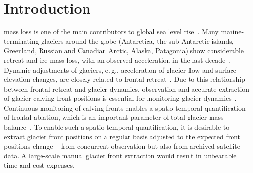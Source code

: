 \documentclass[lettersize,journal,siunitx]{IEEEtran}
\newcommand{\eg}{e.\,g.,\xspace}
\begin{document}
\section{Introduction}
 mass loss is one of the main contributors to global sea level rise~\cite{frederikse2020causes}. Many marine-terminating glaciers around the globe (Antarctica, the sub-Antarctic islands, Greenland, Russian and Canadian Arctic, Alaska, Patagonia) show considerable retreat and ice mass loss, with an observed acceleration in the last decade~\cite{vaughan2014observations,imbie2018mass,hugonnet2021accelerated}.
 Dynamic adjustments of glaciers, \eg acceleration of glacier flow and surface elevation changes, are closely related to frontal retreat~\cite{frank2022geometric}. Due to this relationship between frontal retreat and glacier dynamics, observation and accurate extraction of glacier calving front positions is essential for monitoring glacier dynamics~\cite{davari2020glacier}. Continuous monitoring of calving fronts enables a spatio-temporal quantification of frontal ablation, which is an important parameter of total glacier mass balance~\cite{liu2021automated}. To enable such a spatio-temporal quantification, it is desirable to extract glacier front positions on a regular basis adjusted to the expected front positions change -- from concurrent observation but also from archived satellite data. A large-scale manual glacier front extraction would result in unbearable time and cost expenses.
\end{document}
